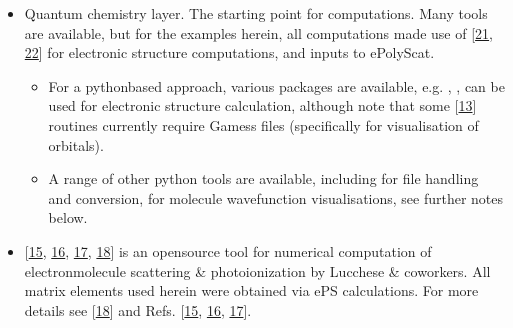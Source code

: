 \documentclass[letterpaper,table,10pt,english]{jupyterBook}
\begin{document}
\begin{itemize}
\item {} 
\sphinxAtStartPar
Quantum chemistry layer. The starting point for  computations. Many tools are available, but for the examples herein, all computations made use of  {[}\hyperlink{cite.backmatter/bibliography:id522}{21}, \hyperlink{cite.backmatter/bibliography:id532}{22}{]} for electronic structure computations, and inputs to ePolyScat.
\begin{itemize}
\item {} 
\sphinxAtStartPar
For a python\sphinxhyphen{}based approach, various packages are available, e.g. , ,  can be used for electronic structure calculation, although note that some  {[}\hyperlink{cite.backmatter/bibliography:id508}{13}{]} routines currently require Gamess files (specifically for visualisation of orbitals).

\item {} 
\sphinxAtStartPar
A range of other python tools are available, including  for file handling and conversion,  for molecule wavefunction visualisations, see further notes below.

\end{itemize}

\item {} 
\sphinxAtStartPar
{} {[}\hyperlink{cite.backmatter/bibliography:id640}{15}, \hyperlink{cite.backmatter/bibliography:id527}{16}, \hyperlink{cite.backmatter/bibliography:id671}{17}, \hyperlink{cite.backmatter/bibliography:id643}{18}{]} is an open\sphinxhyphen{}source tool for numerical computation of electron\sphinxhyphen{}molecule scattering \& photoionization by Lucchese \& coworkers. All matrix elements used herein were obtained via ePS calculations. For more details see  {[}\hyperlink{cite.backmatter/bibliography:id643}{18}{]} and Refs. {[}\hyperlink{cite.backmatter/bibliography:id640}{15}, \hyperlink{cite.backmatter/bibliography:id527}{16}, \hyperlink{cite.backmatter/bibliography:id671}{17}{]}.


\end{itemize}
\end{document}
